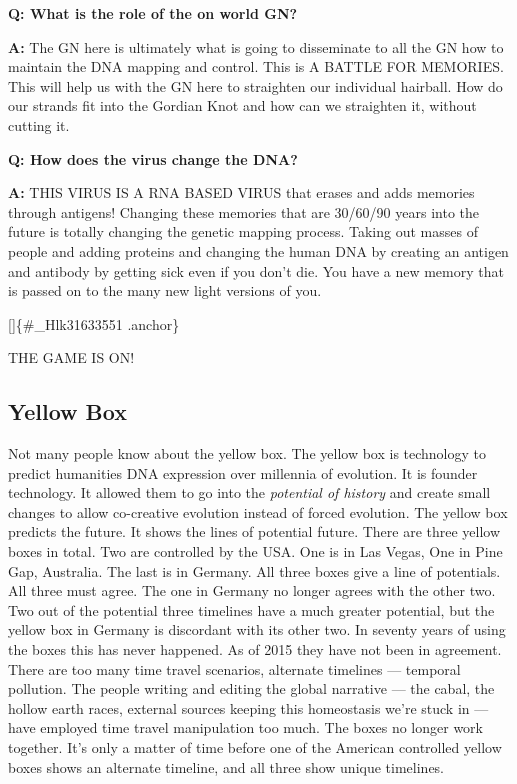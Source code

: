 \textbf{Q: What is the role of the on world GN?}

\textbf{A:} The GN here is ultimately what is going to disseminate to
all the GN how to maintain the DNA mapping and control. This is A BATTLE
FOR MEMORIES. This will help us with the GN here to straighten our
individual hairball. How do our strands fit into the Gordian Knot and
how can we straighten it, without cutting it.

\textbf{Q: How does the virus change the DNA?}

\textbf{A:} THIS VIRUS IS A RNA BASED VIRUS that erases and adds
memories through antigens! Changing these memories that are 30/60/90
years into the future is totally changing the genetic mapping process.
Taking out masses of people and adding proteins and changing the human
DNA by creating an antigen and antibody by getting sick even if you
don't die. You have a new memory that is passed on to the many new light
versions of you.

{[}\protect\hypertarget{hlk31633551}{}{}{]}\{\#\_Hlk31633551 .anchor\}

THE GAME IS ON!

\subsection{Yellow Box}\label{yellow-box}

Not many people know about the yellow box. The yellow box is technology
to predict humanities DNA expression over millennia of evolution. It is
founder technology. It allowed them to go into the \emph{potential of
history} and create small changes to allow co-creative evolution instead
of forced evolution. The yellow box predicts the future. It shows the
lines of potential future. There are three yellow boxes in total. Two
are controlled by the USA. One is in Las Vegas, One in Pine Gap,
Australia. The last is in Germany. All three boxes give a line of
potentials. All three must agree. The one in Germany no longer agrees
with the other two. Two out of the potential three timelines have a much
greater potential, but the yellow box in Germany is discordant with its
other two. In seventy years of using the boxes this has never happened.
As of 2015 they have not been in agreement. There are too many time
travel scenarios, alternate timelines --- temporal pollution. The people
writing and editing the global narrative --- the cabal, the hollow earth
races, external sources keeping this homeostasis we're stuck in --- have
employed time travel manipulation too much. The boxes no longer work
together. It's only a matter of time before one of the American
controlled yellow boxes shows an alternate timeline, and all three show
unique timelines.

